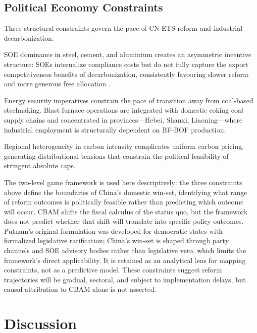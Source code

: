 \documentclass[letterpaper, 10pt, conference]{ieeeconf}
\begin{document}
\subsection{Political Economy Constraints}
\label{sec:constraints}

Three structural constraints govern the pace of CN-ETS reform and
industrial decarbonization.

SOE dominance in steel, cement, and aluminium creates an asymmetric
incentive structure: SOEs internalize compliance costs but do not
fully capture the export competitiveness benefits of decarbonization,
consistently favouring slower reform and more generous free allocation
\citep{Nahm2021}.

Energy security imperatives constrain the pace of transition away from
coal-based steelmaking. Blast furnace operations are integrated with
domestic coking coal supply chains and concentrated in
provinces---Hebei, Shanxi, Liaoning---where industrial employment is
structurally dependent on BF-BOF production.

Regional heterogeneity in carbon intensity complicates uniform carbon
pricing, generating distributional tensions that constrain the
political feasibility of stringent absolute caps.

The two-level game framework \citep{Putnam1988} is used here
descriptively: the three constraints above define the boundaries of
China's domestic win-set, identifying what range of reform outcomes is
politically feasible rather than predicting which outcome will occur.
CBAM shifts the fiscal calculus of the status quo, but the framework
does not predict whether that shift will translate into specific
policy outcomes. Putnam's original formulation was developed for
democratic states with formalized legislative ratification; China's
win-set is shaped through party channels and SOE advisory bodies
rather than legislative veto, which limits the framework's direct
applicability. It is retained as an analytical lens for mapping
constraints, not as a predictive model. These constraints suggest
reform trajectories will be gradual, sectoral, and subject to
implementation delays, but causal attribution to CBAM alone is not
asserted.

\section{Discussion}
\label{sec:discussion}
\end{document}
